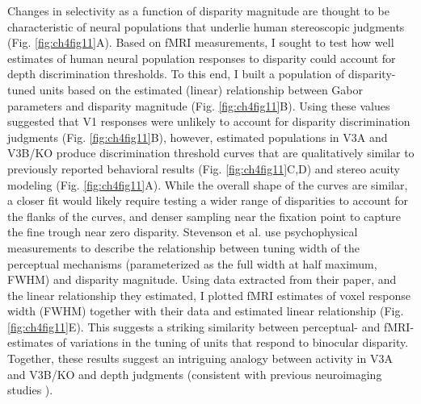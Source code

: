 Changes in selectivity as a function of disparity magnitude are thought to be characteristic of neural populations that underlie human stereoscopic judgments \cite{Lehky:1990fk, Stevenson:1992kx} (Fig. \ref{fig:ch4fig11}A). Based on fMRI measurements, I sought to test how well estimates of human neural population responses to disparity could account for depth discrimination thresholds. To this end, I built a population of disparity-tuned units based on the estimated (linear) relationship between Gabor parameters and disparity magnitude (Fig. \ref{fig:ch4fig11}B). Using these values suggested that V1 responses were unlikely to account for disparity discrimination judgments (Fig. \ref{fig:ch4fig11}B), however, estimated populations in V3A and V3B/KO produce discrimination threshold curves that are qualitatively similar to previously reported behavioral results \cite{Badcock:1985ly} (Fig. \ref{fig:ch4fig11}C,D) and stereo acuity modeling \cite{Lehky:1990fk} (Fig. \ref{fig:ch4fig11}A). While the overall shape of the curves are similar, a closer fit would likely require testing a wider range of disparities to account for the flanks of the curves, and denser sampling near the fixation point to capture the fine trough near zero disparity. Stevenson et al. \cite{Stevenson:1992kx} use psychophysical measurements to describe the relationship between tuning width of the perceptual mechanisms (parameterized as the full width at half maximum, FWHM) and disparity magnitude. Using data extracted from their paper, and the linear relationship they estimated, I plotted fMRI estimates of voxel response width (FWHM) together with their data and estimated linear relationship (Fig. \ref{fig:ch4fig11}E). This suggests a striking similarity between perceptual- and fMRI- estimates of variations in the tuning of units that respond to binocular disparity. Together, these results suggest an intriguing analogy between activity in V3A and V3B/KO and depth judgments (consistent with previous neuroimaging studies \cite{Preston:2008dg,Ban:2012jr,Murphy:2013ys,Dovencioglu:2013zr}). 

